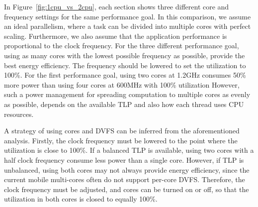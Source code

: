 In Figure~\ref{fig:1cpu_vs_2cpu}, each section shows three different core and frequency settings
for the same performance goal. In this comparison, we assume an ideal parallelism, where
a task can be divided into multiple cores with perfect scaling. Furthermore, we also assume
that the application performance is proportional to the clock frequency.
For the three different performance goal, using as many cores with the lowest possible
frequency as possible, provide the best energy efficiency. The frequency should be 
lowered to set the utilization to 100\%. For the first performance goal,
using two cores at 1.2GHz consumes 50\% more power than using four cores at 600MHz with
100\% utilization 
However, such a power management for spreading computation to multiple cores as evenly as possible, depends
on the available TLP and also how each thread uses CPU resources. 

A strategy of using cores and DVFS can be inferred from the aforementioned analysis.
Firstly, the clock frequency must be lowered to the point where the utilization is close to 100\%.
If a balanced TLP is available, using two cores with a half clock frequency consume less power than
a single core. However, if TLP is unbalanced, using both cores may not always provide energy
efficiency, since the current mobile multi-cores often do not support per-core DVFS. Therefore,
the clock frequency must be adjusted, and cores can be turned on or off, so that
the utilization in both cores is closed to equally 100\%.

